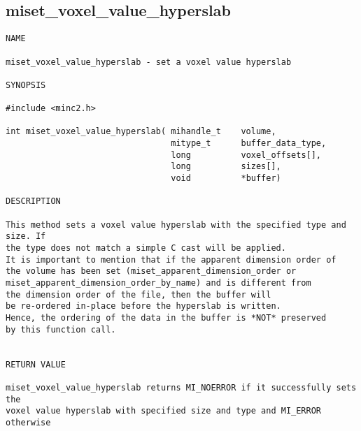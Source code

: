 \documentclass{article}
\begin{document}
\subsection{miset\_voxel\_value\_hyperslab}
\begin{verbatim}
NAME

miset_voxel_value_hyperslab - set a voxel value hyperslab

SYNOPSIS

#include <minc2.h>

int miset_voxel_value_hyperslab( mihandle_t    volume,
                                 mitype_t      buffer_data_type,
                                 long          voxel_offsets[],
                                 long          sizes[],
                                 void          *buffer)

DESCRIPTION

This method sets a voxel value hyperslab with the specified type and size. If
the type does not match a simple C cast will be applied.
It is important to mention that if the apparent dimension order of 
the volume has been set (miset_apparent_dimension_order or 
miset_apparent_dimension_order_by_name) and is different from 
the dimension order of the file, then the buffer will
be re-ordered in-place before the hyperslab is written.  
Hence, the ordering of the data in the buffer is *NOT* preserved 
by this function call.


RETURN VALUE

miset_voxel_value_hyperslab returns MI_NOERROR if it successfully sets the
voxel value hyperslab with specified size and type and MI_ERROR otherwise
\end{verbatim}





\end{document}
